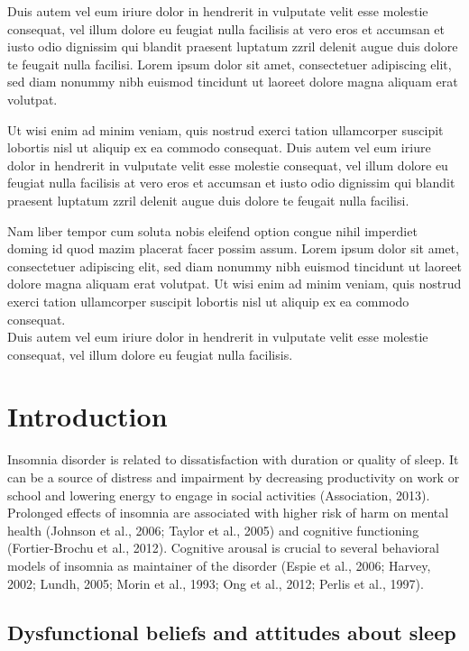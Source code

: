 \documentclass[
  ,doc,11pt, twoside,floatsintext]{apa6}
\begin{document}
Duis autem vel eum iriure dolor in hendrerit in vulputate velit esse molestie consequat, vel illum dolore eu feugiat nulla facilisis at vero eros et accumsan et iusto odio dignissim qui blandit praesent luptatum zzril delenit augue duis dolore te feugait nulla facilisi. Lorem ipsum dolor sit amet, consectetuer adipiscing elit, sed diam nonummy nibh euismod tincidunt ut laoreet dolore magna aliquam erat volutpat.

Ut wisi enim ad minim veniam, quis nostrud exerci tation ullamcorper suscipit lobortis nisl ut aliquip ex ea commodo consequat. Duis autem vel eum iriure dolor in hendrerit in vulputate velit esse molestie consequat, vel illum dolore eu feugiat nulla facilisis at vero eros et accumsan et iusto odio dignissim qui blandit praesent luptatum zzril delenit augue duis dolore te feugait nulla facilisi.

Nam liber tempor cum soluta nobis eleifend option congue nihil imperdiet doming id quod mazim placerat facer possim assum. Lorem ipsum dolor sit amet, consectetuer adipiscing elit, sed diam nonummy nibh euismod tincidunt ut laoreet dolore magna aliquam erat volutpat. Ut wisi enim ad minim veniam, quis nostrud exerci tation ullamcorper suscipit lobortis nisl ut aliquip ex ea commodo consequat.\\
Duis autem vel eum iriure dolor in hendrerit in vulputate velit esse molestie consequat, vel illum dolore eu feugiat nulla facilisis.

\hypertarget{introduction}{%
\section{Introduction}\label{introduction}}

Insomnia disorder is related to dissatisfaction with duration or quality of sleep. It can be a source of distress and impairment by decreasing productivity on work or school and lowering energy to engage in social activities (Association, 2013). Prolonged effects of insomnia are associated with higher risk of harm on mental health (Johnson et al., 2006; Taylor et al., 2005) and cognitive functioning (Fortier-Brochu et al., 2012). Cognitive arousal is crucial to several behavioral models of insomnia as maintainer of the disorder (Espie et al., 2006; Harvey, 2002; Lundh, 2005; Morin et al., 1993; Ong et al., 2012; Perlis et al., 1997).

\hypertarget{dysfunctional-beliefs-and-attitudes-about-sleep}{%
\subsection{Dysfunctional beliefs and attitudes about sleep}\label{dysfunctional-beliefs-and-attitudes-about-sleep}}
\end{document}
